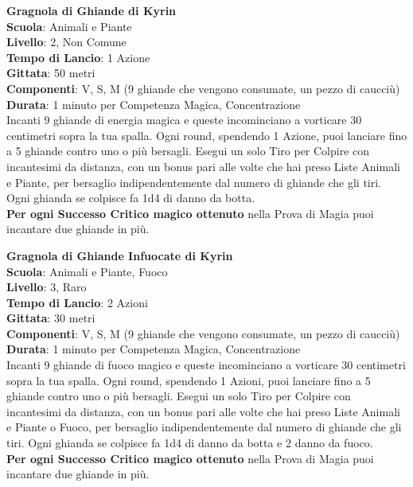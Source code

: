 \begin{multicols}{2}
\medskip\textbf{Gragnola di Ghiande di Kyrin}\\
\textbf{Scuola}: Animali e Piante\\
\textbf{Livello}: 2, Non Comune\\
\textbf{Tempo di Lancio}: 1 Azione\\
\textbf{Gittata}: 50 metri\\
\textbf{Componenti}: V, S, M (9 ghiande che vengono consumate, un pezzo di caucciù)\\
\textbf{Durata}: 1 minuto per Competenza Magica, Concentrazione\\
Incanti 9 ghiande di energia magica e queste incominciano a vorticare 30 centimetri sopra la tua spalla.
Ogni round, spendendo 1 Azione, puoi lanciare fino a 5 ghiande contro uno o più bersagli. Esegui un solo Tiro per Colpire con incantesimi da distanza, con un bonus pari alle volte che hai preso Liste Animali e Piante, per bersaglio indipendentemente dal numero di ghiande che gli tiri. Ogni ghianda se colpisce fa 1d4 di danno da botta.\\
\textbf{Per ogni Successo Critico magico ottenuto} nella Prova di Magia puoi incantare due ghiande in più.

\medskip\textbf{Gragnola di Ghiande Infuocate di Kyrin}\\
\textbf{Scuola}: Animali e Piante, Fuoco\\
\textbf{Livello}: 3, Raro\\
\textbf{Tempo di Lancio}: 2 Azioni\\
\textbf{Gittata}: 30 metri\\
\textbf{Componenti}: V, S, M (9 ghiande che vengono consumate, un pezzo di caucciù)\\
\textbf{Durata}: 1 minuto per Competenza Magica, Concentrazione\\
Incanti 9 ghiande di fuoco magico e queste incominciano a vorticare 30 centimetri sopra la tua spalla.
Ogni round, spendendo 1 Azioni, puoi lanciare fino a 5 ghiande contro uno o più bersagli. Esegui un solo Tiro per Colpire con incantesimi da distanza, con un bonus pari alle volte che hai preso Liste Animali e Piante o Fuoco, per bersaglio indipendentemente dal numero di ghiande che gli tiri. Ogni ghianda se colpisce fa 1d4 di danno da botta e 2 danno da fuoco.\\
\textbf{Per ogni Successo Critico magico ottenuto} nella Prova di Magia puoi incantare due ghiande in più.


\end{multicols}
